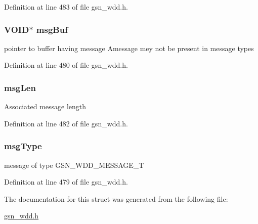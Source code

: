 Definition at line 483 of file gsn\_\-wdd.h.

\hypertarget{a00277_a72b1154b214c336a4c7d2673d86514b8}{
\subsubsection[{msgBuf}]{\setlength{\rightskip}{0pt plus 5cm}VOID$\ast$ {\bf msgBuf}}}
\label{a00277_a72b1154b214c336a4c7d2673d86514b8}
pointer to buffer having message Amessage mey not be present in message types 

Definition at line 480 of file gsn\_\-wdd.h.

\hypertarget{a00277_afa6b7ecbe2ec2cb4b1ccae61dba3724a}{
\subsubsection[{msgLen}]{ {\bf msgLen}}}
\label{a00277_afa6b7ecbe2ec2cb4b1ccae61dba3724a}
Associated message length 

Definition at line 482 of file gsn\_\-wdd.h.

\hypertarget{a00277_a46e39f3ee19777793465d737d462b41a}{
\subsubsection[{msgType}]{ {\bf msgType}}}
\label{a00277_a46e39f3ee19777793465d737d462b41a}
message of type GSN\_\-WDD\_\-MESSAGE\_\-T 

Definition at line 479 of file gsn\_\-wdd.h.



The documentation for this struct was generated from the following file:\begin{DoxyCompactItemize}
\item 
\hyperlink{a00603}{gsn\_\-wdd.h}\end{DoxyCompactItemize}
